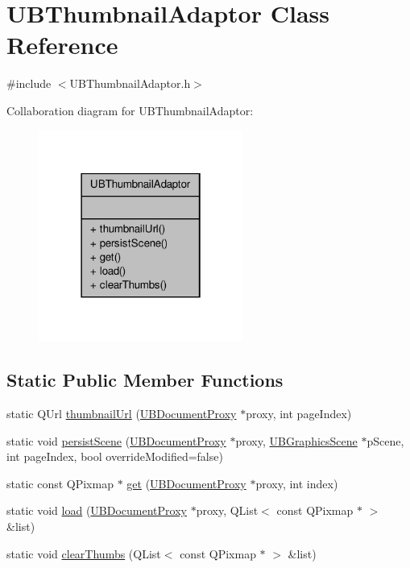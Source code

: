 \hypertarget{class_u_b_thumbnail_adaptor}{\section{U\-B\-Thumbnail\-Adaptor Class Reference}
\label{d0/d06/class_u_b_thumbnail_adaptor}
}


{\ttfamily \#include $<$U\-B\-Thumbnail\-Adaptor.\-h$>$}



Collaboration diagram for U\-B\-Thumbnail\-Adaptor\-:
\nopagebreak
\begin{figure}[H]
\begin{center}
\leavevmode
\includegraphics[width=190pt]{d3/d75/class_u_b_thumbnail_adaptor__coll__graph}
\end{center}
\end{figure}
\subsection*{Static Public Member Functions}
\begin{DoxyCompactItemize}
\item 
static Q\-Url \hyperlink{class_u_b_thumbnail_adaptor_a2b61087433cc3b1b78b6ccfed61de9e3}{thumbnail\-Url} (\hyperlink{class_u_b_document_proxy}{U\-B\-Document\-Proxy} $\ast$proxy, int page\-Index)
\item 
static void \hyperlink{class_u_b_thumbnail_adaptor_a83dbb324cc019a5e6862d497e9c4a5d6}{persist\-Scene} (\hyperlink{class_u_b_document_proxy}{U\-B\-Document\-Proxy} $\ast$proxy, \hyperlink{class_u_b_graphics_scene}{U\-B\-Graphics\-Scene} $\ast$p\-Scene, int page\-Index, bool override\-Modified=false)
\item 
static const Q\-Pixmap $\ast$ \hyperlink{class_u_b_thumbnail_adaptor_a1091dfe6f3cd9fc2abd2de3604d9ec10}{get} (\hyperlink{class_u_b_document_proxy}{U\-B\-Document\-Proxy} $\ast$proxy, int index)
\item 
static void \hyperlink{class_u_b_thumbnail_adaptor_adcb1e2aedc83a85ac0407d9332f8ea65}{load} (\hyperlink{class_u_b_document_proxy}{U\-B\-Document\-Proxy} $\ast$proxy, Q\-List$<$ const Q\-Pixmap $\ast$ $>$ \&list)
\item 
static void \hyperlink{class_u_b_thumbnail_adaptor_aed86191f67adb75e22ad9e2b3d1be7ca}{clear\-Thumbs} (Q\-List$<$ const Q\-Pixmap $\ast$ $>$ \&list)
\end{DoxyCompactItemize}


